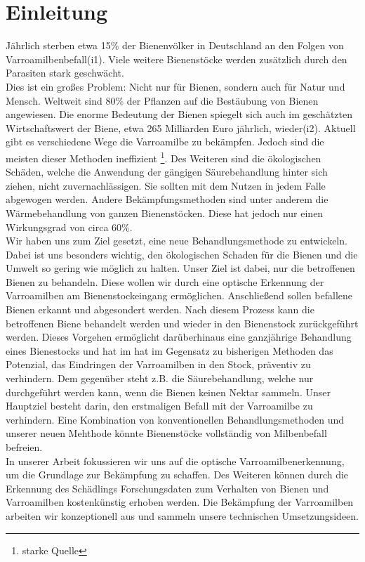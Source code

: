 \documentclass[11pt,a4paper]{article}
\begin{document}
\section{Einleitung}
Jährlich sterben etwa 15\% der Bienenvölker in Deutschland an den Folgen von Varroamilbenbefall(i1).
Viele weitere Bienenstöcke werden zusätzlich durch den Parasiten stark geschwächt.\\
Dies ist ein großes Problem: Nicht nur für Bienen, sondern auch für Natur und Mensch. Weltweit sind 80\% der Pflanzen auf die Bestäubung von Bienen angewiesen. Die enorme Bedeutung der Bienen spiegelt sich auch im geschätzten Wirtschaftswert der Biene, etwa 265 Milliarden Euro jährlich, wieder(i2).
Aktuell gibt es verschiedene Wege die Varroamilbe zu bekämpfen. Jedoch sind die meisten dieser Methoden ineffizient \footnote{starke Quelle}. Des Weiteren sind die ökologischen Schäden, welche die Anwendung der gängigen Säurebehandlung hinter sich ziehen, nicht zuvernachlässigen. Sie sollten mit dem Nutzen in jedem Falle abgewogen werden. Andere Bekämpfungsmethoden sind unter anderem die Wärmebehandlung von ganzen Bienenstöcken. Diese hat jedoch nur einen Wirkungsgrad von circa 60\%.\\
Wir haben uns zum Ziel gesetzt, eine neue Behandlungsmethode zu entwickeln. Dabei ist uns besonders wichtig, den ökologischen Schaden für die Bienen und die Umwelt so gering wie möglich zu halten. Unser Ziel ist dabei, nur die betroffenen Bienen zu behandeln. Diese wollen wir durch eine optische Erkennung der Varroamilben am Bienenstockeingang ermöglichen. Anschließend sollen befallene Bienen erkannt und abgesondert werden. Nach diesem Prozess kann die betroffenen Biene behandelt werden und wieder in den Bienenstock zurückgeführt werden. Dieses Vorgehen ermöglicht darüberhinaus eine ganzjährige Behandlung eines Bienestocks und hat im hat im Gegensatz zu bisherigen Methoden das Potenzial, das Eindringen der Varroamilben in den Stock, präventiv zu verhindern.  Dem gegenüber steht z.B. die Säurebehandlung, welche nur durchgeführt werden kann, wenn die Bienen keinen Nektar sammeln. Unser Hauptziel besteht darin, den erstmaligen Befall mit der Varroamilbe zu verhindern. Eine Kombination von konventionellen Behandlungsmethoden und unserer neuen Mehthode könnte Bienenstöcke vollständig von Milbenbefall befreien.\\
In unserer Arbeit fokussieren wir uns auf die optische Varroamilbenerkennung, um die Grundlage zur Bekämpfung zu schaffen. Des Weiteren können durch die Erkennung des Schädlings Forschungsdaten zum Verhalten von Bienen und Varroamilben kostenkünstig erhoben werden. Die Bekämpfung der Varroamilben arbeiten wir konzeptionell aus und sammeln unsere technischen Umsetzungsideen.\\
\end{document}
